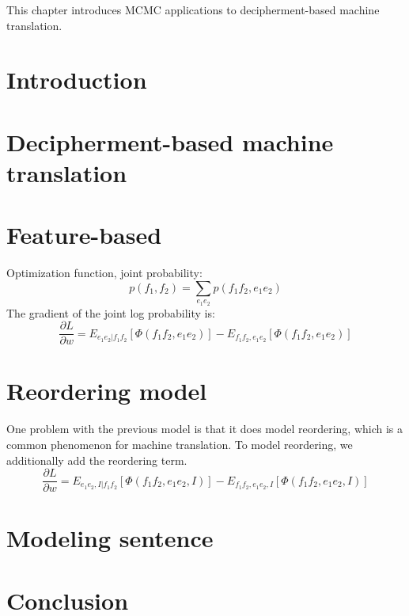 This chapter introduces MCMC applications to decipherment-based machine translation.
\section{Introduction}
\section{Decipherment-based machine translation}
\section{Feature-based}
Optimization function, joint probability:
$$p(f_1,f_2) = \sum_{e_1e_2}p(f_1f_2,e_1e_2)$$
The gradient of the joint log probability is:
$$\frac{\partial L}{\partial w} = E_{e_1e_2|f_1f_2}[\Phi(f_1f_2,e_1e_2)] - E_{f_1f_2,e_1e_2}[\Phi(f_1f_2,e_1e_2)]$$
\section{Reordering model}
One problem with the previous model is that it does model reordering, which is a common phenomenon for machine translation. To model reordering, we additionally add the reordering term.
$$\frac{\partial L}{\partial w} = E_{e_1e_2, I|f_1f_2}[\Phi(f_1f_2,e_1e_2, I)] - E_{f_1f_2,e_1e_2, I}[\Phi(f_1f_2,e_1e_2,I)]$$
\section{Modeling sentence}

\section{Conclusion}
